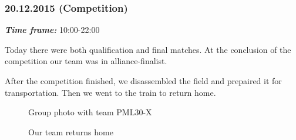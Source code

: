 \subsubsection{20.12.2015 (Competition)}
\textit{\textbf{Time frame:}} 10:00-22:00 

Today there were both qualification and final matches. At the conclusion of the competition our team was in alliance-finalist.

After the competition finished, we disassembled the field and prepaired it for transportation. Then we went to the train to return home.

\begin{figure}[H]
	\begin{minipage}[h]{0.47\linewidth}
		\caption{Group photo with team PML30-X}
	\end{minipage}
	\hfill
	\begin{minipage}[h]{0.47\linewidth}
		\caption{Our team returns home}
	\end{minipage}
\end{figure}
